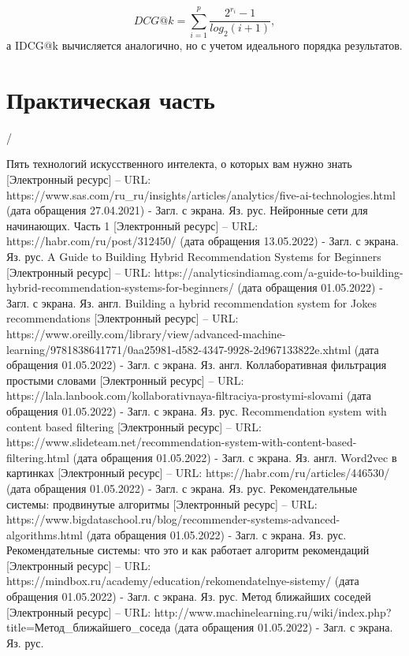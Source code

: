 \documentclass[bachelor, och, coursework]{SCWorks}
\begin{document}
\begin{equation}
    DCG@k = \sum_{i=1}^p\frac{2^{r_i} - 1}{log_2(i+1)},
\end{equation}
а IDCG@k вычисляется аналогично, но с учетом идеального порядка результатов.
\section{Практическая часть}
\conclusion 
/
\begin{thebibliography}{99}
    Пять технологий искусственного интелекта, о которых вам нужно знать [Электронный ресурс] – URL: https://www.sas.com/ru_ru/insights/articles/analytics/five-ai-technologies.html (дата обращения 27.04.2021) - Загл. с экрана. Яз. рус.
    Нейронные сети для начинающих. Часть 1 [Электронный ресурс] – URL: https://habr.com/ru/post/312450/ (дата обращения 13.05.2022) - Загл. с экрана. Яз. рус.
    A Guide to Building Hybrid Recommendation Systems for Beginners [Электронный ресурс] – URL: https://analyticsindiamag.com/a-guide-to-building-hybrid-recommendation-systems-for-beginners/ (дата обращения 01.05.2022) - Загл. с экрана. Яз. англ.
    Building a hybrid recommendation system for Jokes recommendations [Электронный ресурс] – URL: https://www.oreilly.com/library/view/advanced-machine-learning/9781838641771/0aa25981-d582-4347-9928-2d967133822e.xhtml (дата обращения 01.05.2022) - Загл. с экрана. Яз. англ.
    Коллаборативная фильтрация простыми словами [Электронный ресурс] – URL: https://lala.lanbook.com/kollaborativnaya-filtraciya-prostymi-slovami (дата обращения 01.05.2022) - Загл. с экрана. Яз. рус.
    Recommendation system with content based filtering [Электронный ресурс] – URL: https://www.slideteam.net/recommendation-system-with-content-based-filtering.html (дата обращения 01.05.2022) - Загл. с экрана. Яз. англ.
    Word2vec в картинках [Электронный ресурс] – URL: https://habr.com/ru/articles/446530/ (дата обращения 01.05.2022) - Загл. с экрана. Яз. рус.
    Рекомендательные системы: продвинутые алгоритмы [Электронный ресурс] – URL: https://www.bigdataschool.ru/blog/recommender-systems-advanced-algorithms.html (дата обращения 01.05.2022) - Загл. с экрана. Яз. рус.
    Рекомендательные системы: что это и как работает алгоритм рекомендаций [Электронный ресурс] – URL: https://mindbox.ru/academy/education/rekomendatelnye-sistemy/ (дата обращения 01.05.2022) - Загл. с экрана. Яз. рус.
    Метод ближайших соседей [Электронный ресурс] – URL: http://www.machinelearning.ru/wiki/index.php?title=Метод_ближайшего_соседа (дата обращения 01.05.2022) - Загл. с экрана. Яз. рус.

\end{thebibliography}
\end{document}
